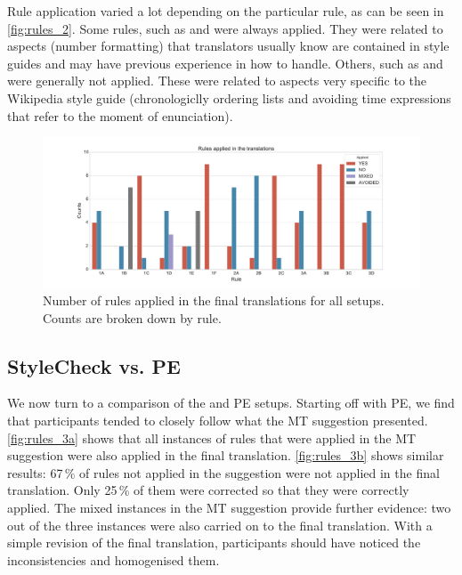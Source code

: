 Rule application varied a lot depending on the particular rule, as can be seen in \autoref{fig:rules_2}. Some rules, such as  and  were always applied. They were related to aspects (number formatting) that translators usually know are contained in style guides and may have previous experience in how to handle. Others, such as  and  were generally not applied. These were related to aspects very specific to the Wikipedia style guide (chronologiclly ordering lists and avoiding time expressions that refer to the moment of enunciation).

\begin{figure}[H]
\includegraphics[width=\textwidth]{img/rules/rules_2}
\caption{Number of rules applied in the final translations for all setups. Counts are broken down by rule.}
\label{fig:rules_2}
\end{figure}

\subsection{StyleCheck vs. \ac{PE}}

\noindent We now turn to a comparison of the \style and \ac{PE} setups. Starting off with \ac{PE}, we find that participants tended to closely follow what the \ac{MT} suggestion presented. \autoref{fig:rules_3a} shows that all instances of rules that were applied in the \ac{MT} suggestion were also applied in the final translation. \autoref{fig:rules_3b} shows similar results: 67\,\% of rules not applied in the suggestion were not applied in the final translation. Only 25\,\% of them were corrected so that they were correctly applied. The mixed instances in the \ac{MT} suggestion provide further evidence: two out of the three instances were also carried on to the final translation. With a simple revision of the final translation, participants should have noticed the inconsistencies and homogenised them.

